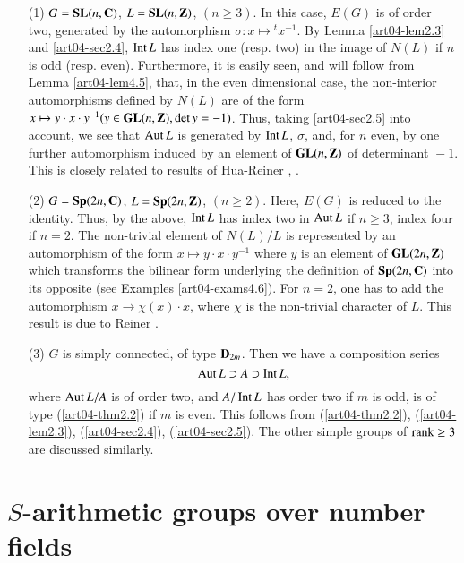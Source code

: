 \setcounter{theorem}{5}
\begin{examples}\label{art04-exams2.6}
\begin{itemize}
\item[(1)] $G=\mathbf{SL}(n,\mathbf{C})$, $L=\mathbf{SL}(n,\mathbf{Z})$, $(n\geq 3)$. In this case, $E(G)$ is of order two, generated by the automorphism $\sigma:x\mapsto {}^{t}x^{-1}$. By Lemma \ref{art04-lem2.3} and \ref{art04-sec2.4}, $\operatorname{\mathrm{Int}} L$ has index one (resp. two) in the image of $N(L)$ if $n$ is odd (resp. even). Furthermore, it is easily seen, and will follow from Lemma \ref{art04-lem4.5}, that, in the even dimensional case, the non-interior automorphisms defined by $N(L)$ are of the form $x\mapsto y\cdot x\cdot y^{-1}(y\in \mathbf{GL}(n,\mathbf{Z}), \det y=-1)$. Thus, taking \ref{art04-sec2.5} into account, we see that $\operatorname{\mathrm{Aut}} L$ is generated by $\operatorname{\mathrm{Int}} L$, $\sigma$, and, for $n$ even, by one further automorphism induced by an element of $\mathbf{GL}(n,\mathbf{Z})$ of determinant ${}-1$. This is closely related to results of Hua-Reiner \cite{art04-key12}, \cite{art04-key13}.

\item[(2)] $G=\mathbf{Sp}(2n,\mathbf{C})$, $L=\mathbf{Sp}(2n,\mathbf{Z})$, $(n\geq 2)$. Here, $E(G)$ is reduced to the identity. Thus, by the above, $\operatorname{\mathrm{Int}} L$ has index two in $\operatorname{\mathrm{Aut}} L$ if $n\geq 3$, index four if $n=2$. The non-trivial element of $N(L)/L$ is represented by an automorphism of the form $x\mapsto y\cdot x\cdot y^{-1}$ where $y$ is an element of $\mathbf{GL}(2n,\mathbf{Z})$ which transforms the bilinear form underlying the definition of $\mathbf{Sp}(2n,\mathbf{C})$ into its opposite (see Examples \ref{art04-exams4.6}). For $n=2$, one has to add the automorphism $x\to \chi(x)\cdot x$, where $\chi$ is the non-trivial character of $L$. This result is due to Reiner \cite{art04-key27}.

\item[(3)] $G$ is simply connected, of type $\mathbf{D}_{2m}$. Then we have a composition series
$$
\operatorname{\mathrm{Aut}} L\supset A\supset \operatorname{\mathrm{Int}} L,
$$
where $\operatorname{\mathrm{Aut}} L/A$ is of order two, and $A/\operatorname{\mathrm{Int}} L$ has order two if $m$ is odd, is of type (\ref{art04-thm2.2}) if $m$ is even. This follows from (\ref{art04-thm2.2}), (\ref{art04-lem2.3}), (\ref{art04-sec2.4}), (\ref{art04-sec2.5}). The other simple groups of $\operatorname{\mathrm{rank}} \geq 3$ are discussed similarly.
\end{itemize}
\end{examples}

\section{\texorpdfstring{$S$}{S}-arithmetic groups over number fields}\label{art04-sec3}
\pageoriginale


